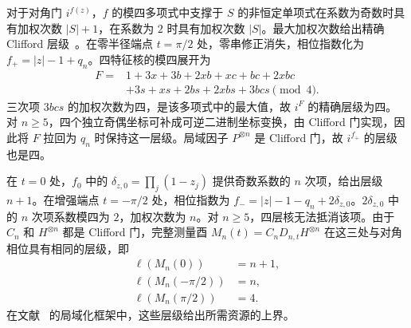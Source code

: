对于对角门 $i^{f(z)}$，$f$ 的模四多项式中支撑于 $S$ 的非恒定单项式在系数为奇数时具有加权次数 $|S|+1$，在系数为 $2$ 时具有加权次数 $|S|$。最大加权次数给出精确 Clifford 层级~\cite{GottesmanChuang1999,Cui2017}。在零半径端点 $t=\pi/2$ 处，零串修正消失，相位指数化为 $f_+=|z|-1+q_n$。四特征核的模四展开为
\begin{equation}
 \begin{aligned}
 F={}&1+3x+3b+2xb+xc+bc+2xbc\\
 &+3s+xs+2bs+2xbs+3bcs\pmod4.
 \end{aligned}
 \label{physics:kernel-mod-four}
\end{equation}
三次项 $3bcs$ 的加权次数为四，是该多项式中的最大值，故 $i^F$ 的精确层级为四。对 $n\ge5$，四个独立奇偶坐标可补成可逆二进制坐标变换，由 Clifford 门实现，因此将 $F$ 拉回为 $q_n$ 时保持这一层级。局域因子 $P^{\otimes n}$ 是 Clifford 门，故 $i^{f_+}$ 的层级也是四。

在 $t=0$ 处，$f_0$ 中的 $\delta_{z,0}=\prod_j(1-z_j)$ 提供奇数系数的 $n$ 次项，给出层级 $n+1$。在增强端点 $t=-\pi/2$ 处，相位指数为 $f_-=|z|-1-q_n+2\delta_{z,0}$。$2\delta_{z,0}$ 中的 $n$ 次项系数模四为 $2$，加权次数为 $n$。对 $n\ge5$，四层核无法抵消该项。由于 $C_n$ 和 $H^{\otimes n}$ 都是 Clifford 门，完整测量酉 $M_n(t)=C_nD_{n,t}H^{\otimes n}$ 在这三处与对角相位具有相同的层级，即
\begin{equation}
 \begin{aligned}
 \ell(M_n(0))&=n+1,\\
 \ell(M_n(-\pi/2))&=n,\\
 \ell(M_n(\pi/2))&=4.
 \end{aligned}
 \label{physics:levels}
\end{equation}
在文献~\cite{PauwelsLocalization2025,PauwelsGisin2026} 的局域化框架中，这些层级给出所需资源的上界。
